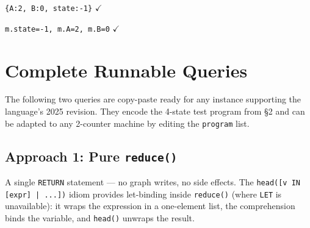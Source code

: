 \documentclass[sigconf, anonymous, review, nonacm]{acmart}
\begin{document}
\begin{resultbox}
\texttt{\{A:2, B:0, state:-1\}} \enspace$\checkmark$
\end{resultbox}

\begin{resultbox}
\texttt{m.state=-1, m.A=2, m.B=0} \enspace$\checkmark$
\end{resultbox}

\section{Complete Runnable Queries}

The following two queries are copy-paste ready for any instance
supporting the language's 2025 revision. They encode the 4-state test
program from \S2 and can be adapted to any 2-counter machine by
editing the \texttt{program} list.

\subsection{Approach 1: Pure \texttt{reduce()}}

A single \texttt{RETURN} statement --- no graph writes, no side effects.
The \texttt{head([v IN [expr] | ...])} idiom provides let-binding
inside \texttt{reduce()} (where \texttt{LET} is unavailable): it wraps
the expression in a one-element list, the comprehension binds the
variable, and \texttt{head()} unwraps the result.
\end{document}
